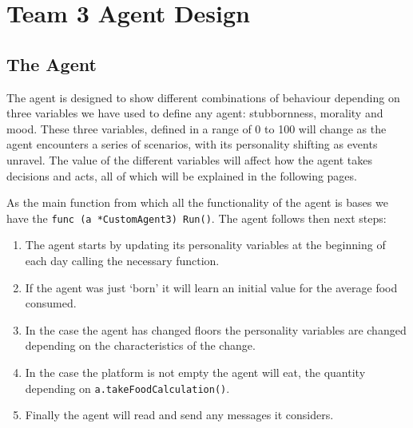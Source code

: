 \chapter{Team 3 Agent Design}\label{team_3_agent_design}

\section{The Agent}\label{the_agent}
The agent is designed to show different combinations of behaviour depending on three variables we have used to define any agent: stubbornness,  morality and mood. These three variables, defined in a range of 0 to 100 will change as the agent encounters a series of scenarios, with its personality shifting as events unravel.  The value of the different variables will affect how the agent takes decisions and acts, all of which will be explained in the following pages. \par
As the main function from which all the functionality of the agent is bases we have the \texttt{func (a *CustomAgent3) Run()}. The agent follows then next steps:
\begin{enumerate}
    \item The agent starts by updating its personality variables at the beginning of each day calling the necessary function. 
    \item If the agent was just ‘born’ it will learn an initial value for the average food consumed. 
    \item In the case the agent has changed floors the personality variables are changed depending on the characteristics of the change. 
    \item In the case the platform is not empty the agent will eat, the quantity depending on \texttt{a.takeFoodCalculation()}.
    \item Finally the agent will read and send any messages it considers.
\end{enumerate}

